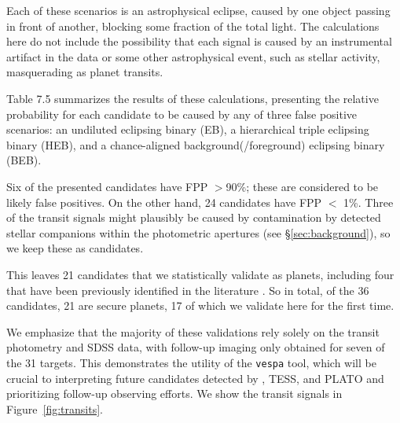 Each of these scenarios is an astrophysical eclipse, caused by one
object passing in front of another, blocking some fraction of the
total light.
The calculations here do not include the possibility
that each signal is caused by an instrumental artifact in the data or
some other astrophysical event, such as stellar activity, masquerading
as planet transits.

Table 7.5 summarizes the results of these
calculations, presenting the relative probability for each candidate
to be caused by any of three false positive scenarios: an undiluted
eclipsing binary (EB), a hierarchical triple eclipsing binary (HEB),
and a chance-aligned background(/foreground) eclipsing binary (BEB).

Six of the presented candidates have FPP $>$90\%;
these are considered to be likely false positives.
On the other hand, 24 candidates
have FPP $<$ 1\%.
Three of the transit signals might plausibly be caused by
contamination by detected stellar companions within the photometric apertures
(see \S\ref{sec:background}), so we keep these as candidates.

This leaves 21 candidates that we statistically validate as planets, including
four that have been previously
identified in the literature \citep{Armstrong15b, Crossfield15}.
So in total, of the 36 candidates, 21 are secure planets,
17 of which we validate here for the first time.


We emphasize that the majority of these validations rely
solely on the transit photometry and SDSS data, with follow-up imaging only obtained for
seven of the 31 targets.  This
demonstrates the utility of the \texttt{vespa} tool, which will be
crucial to interpreting future candidates detected by \KT, TESS, and PLATO
and prioritizing follow-up observing efforts.
We show the transit signals in Figure~\ref{fig:transits}.

